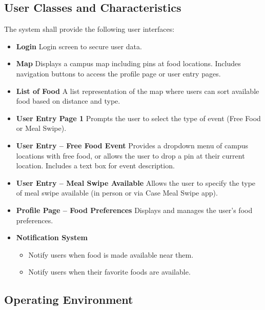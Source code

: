 \documentclass[12pt]{article}
\begin{document}
\subsection{User Classes and Characteristics}

The system shall provide the following user interfaces:

\begin{itemize}
    \item \textbf{Login}  
    Login screen to secure user data.

    \item \textbf{Map}  
    Displays a campus map including pins at food locations.  
    Includes navigation buttons to access the profile page or user entry pages.

    \item \textbf{List of Food}  
    A list representation of the map where users can sort available food based on distance and type.

    \item \textbf{User Entry Page 1}  
    Prompts the user to select the type of event (Free Food or Meal Swipe).

    \item \textbf{User Entry -- Free Food Event}  
    Provides a dropdown menu of campus locations with free food,  
    or allows the user to drop a pin at their current location.  
    Includes a text box for event description.

    \item \textbf{User Entry -- Meal Swipe Available}  
    Allows the user to specify the type of meal swipe available (in person or via Case Meal Swipe app).

    \item \textbf{Profile Page -- Food Preferences}  
    Displays and manages the user’s food preferences.

    \item \textbf{Notification System}  
    \begin{itemize}
        \item Notify users when food is made available near them.  
        \item Notify users when their favorite foods are available.  
    \end{itemize}
\end{itemize}
\subsection{Operating Environment}
\end{document}

